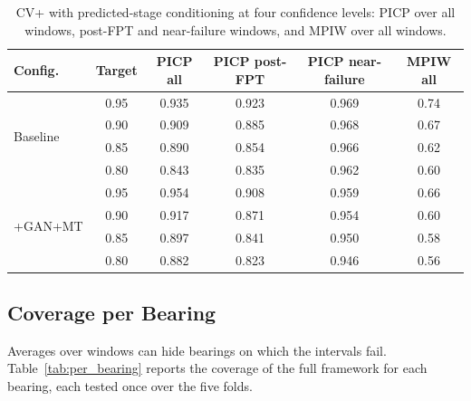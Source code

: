 \documentclass[review]{elsarticle}
\begin{document}
\begin{table}[htbp]
\centering
\caption{CV+ with predicted-stage conditioning at four confidence
levels: PICP over all windows, post-FPT and near-failure windows, and
MPIW over all windows.}
\label{tab:alpha}
\footnotesize
\renewcommand{\arraystretch}{1.2}
\setlength{\tabcolsep}{4pt}
\begin{tabular}{lccccc}
\toprule
\textbf{Config.} & \textbf{Target} & \textbf{PICP all} &
\textbf{PICP post-FPT} & \textbf{PICP near-failure} & \textbf{MPIW all} \\
\midrule
\multirow{4}{*}{Baseline}
 & 0.95 & 0.935 & 0.923 & 0.969 & 0.74 \\
 & 0.90 & 0.909 & 0.885 & 0.968 & 0.67 \\
 & 0.85 & 0.890 & 0.854 & 0.966 & 0.62 \\
 & 0.80 & 0.843 & 0.835 & 0.962 & 0.60 \\
\midrule
\multirow{4}{*}{+GAN+MT}
 & 0.95 & 0.954 & 0.908 & 0.959 & 0.66 \\
 & 0.90 & 0.917 & 0.871 & 0.954 & 0.60 \\
 & 0.85 & 0.897 & 0.841 & 0.950 & 0.58 \\
 & 0.80 & 0.882 & 0.823 & 0.946 & 0.56 \\
\bottomrule
\end{tabular}
\end{table}

\subsection{Coverage per Bearing}
\label{sec:res_per_bearing}

Averages over windows can hide bearings on which the intervals fail.
Table~\ref{tab:per_bearing} reports the coverage of the full framework
for each bearing, each tested once over the five folds.
\end{document}
